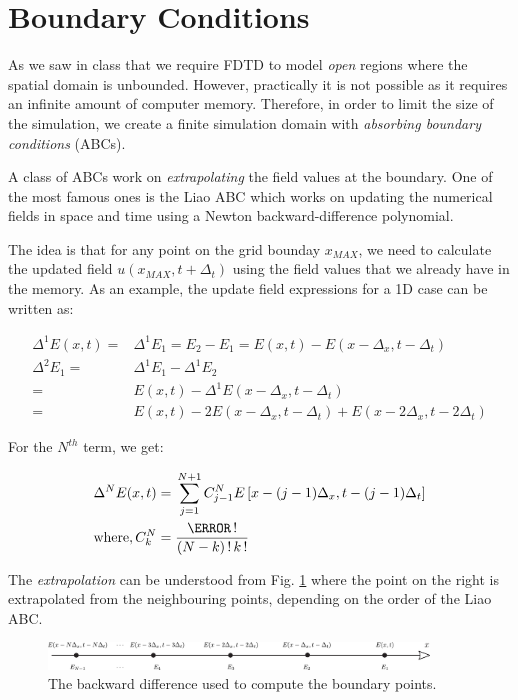\documentclass[12pt]{article}
\begin{document}
\section{Boundary Conditions}

As we saw in class that we require FDTD to model \textit{open} regions where the spatial domain is unbounded. However, practically it is not possible as it requires an infinite amount of computer memory. Therefore, in order to limit the size of the simulation, we create a finite simulation domain with \textit{absorbing boundary conditions} (ABCs).  

A class of ABCs work on \textit{extrapolating} the field values at the boundary. One of the most famous ones is the Liao ABC \cite{liao_transmitting_1984} which works on updating the numerical fields in space and time using a Newton backward-difference polynomial.


The idea is that for any point on the grid bounday $x_{MAX}$, we need to calculate the updated field $u(x_{MAX}, t + \Delta_t)$ using the field values that we already have in the memory. As an example, the update field expressions for a 1D case can be written as:

\begin{align}
\Delta^1 E(x ,t) ={} & \Delta^1 E_1 = E_2 - E_1  = E(x,t) - E(x - \Delta_x, t - \Delta_t) \nonumber \\
\Delta^2 E_1 ={} & \Delta^1 E_1 - \Delta^1 E_2 \nonumber \\
={} & E(x,t) - \Delta^1 E(x - \Delta_x, t - \Delta_t) \nonumber \\
={} & E(x,t) - 2E(x - \Delta_x, t - \Delta_t) + E(x - 2\Delta_x, t - 2\Delta_t)
\end{align}

For the $N^{th}$ term, we get:

\begin{align}
  \Delta^N E(x ,t) ={} & \sum_{j = 1}^{N+1} C_{j-1}^{N} E\left[x - (j -1)\Delta_x, t - (j -1)\Delta_t\right] \nonumber \\
  \mathrm{where,} \, C_k^N ={} & \frac{\N\,!}{(N - k)\,! \, k\,!}
\end{align}

The \textit{extrapolation} can be understood from Fig. \ref{fig:backward_difference} where the point on the right is extrapolated from the neighbouring points, depending on the order of the Liao ABC.


\begin{figure}[t!]
  \centering
  \includegraphics[width=0.9\textwidth]{backward difference.pdf}
  \caption{The backward difference used to compute the boundary points.}
  \label{fig:backward_difference}
\end{figure}
\end{document}
